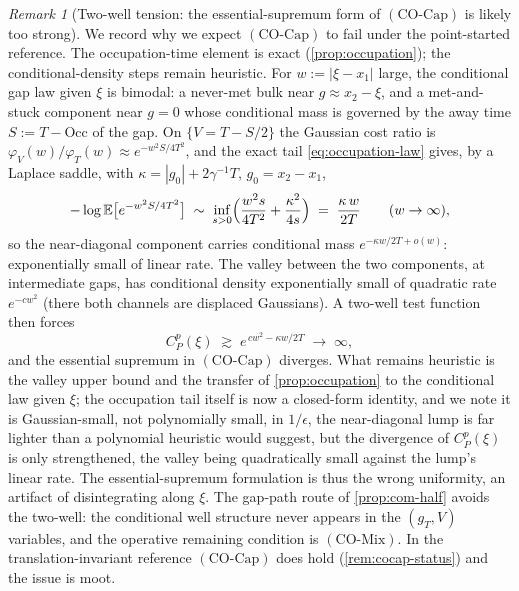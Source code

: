 \documentclass[reqno,final,11pt]{amsart}
\theoremstyle{plain}
\theoremstyle{definition}
\theoremstyle{remark}
\newtheorem{remark}[theorem]{Remark}
\newcommand{\E}{\mathbb E}
\newcommand{\COcap}{(\mathrm{CO\text{-}Cap})}
\newcommand{\COmix}{(\mathrm{CO\text{-}Mix})}
\begin{document}
\begin{remark}[Two-well tension: the essential-supremum form of $\COcap$ is likely too strong]\label{rem:two-well}
We record why we expect $\COcap$ to fail under the point-started
reference. The occupation-time element is exact
(\cref{prop:occupation}); the conditional-density steps remain heuristic. For
$w:=|\xi-x_1|$ large, the conditional gap law given $\xi$ is bimodal: a
never-met bulk near $g\approx x_2-\xi$, and a met-and-stuck
component near $g=0$ whose conditional mass is governed by the away time
$S:=T-\mathrm{Occ}$ of the gap. On $\{V=T-S/2\}$ the Gaussian cost ratio is
$\varphi_V(w)/\varphi_T(w)\approx e^{-w^2S/4T^2}$, and the exact tail
\eqref{eq:occupation-law} gives, by a Laplace saddle, with
$\kappa=|g_0|+2\gamma^{-1}T$, $g_0=x_2-x_1$,
\[
  -\log\E\bigl[e^{-w^2S/4T^2}\bigr]\;\sim\;
  \inf_{s>0}\Bigl(\frac{w^2s}{4T^2}+\frac{\kappa^2}{4s}\Bigr)
  \;=\;\frac{\kappa\,w}{2T}\qquad(w\to\infty),
\]
so the near-diagonal component carries conditional mass
$e^{-\kappa w/2T+o(w)}$: exponentially small of linear rate. The valley
between the two components, at intermediate gaps, has conditional density
exponentially small of quadratic rate $e^{-cw^2}$ (there both channels
are displaced Gaussians). A two-well test function then forces
\[
  C^p_P(\xi)\;\gtrsim\;e^{\,cw^2-\kappa w/2T}\;\longrightarrow\;\infty ,
\]
and the essential supremum in $\COcap$ diverges. What remains heuristic is the
valley upper bound and the transfer of \cref{prop:occupation} to the
conditional law given $\xi$; the occupation tail itself is now a closed-form
identity, and we note it is Gaussian-small, not polynomially small, in
$1/\epsilon$, the near-diagonal lump is far lighter than a polynomial
heuristic would suggest, but the divergence of $C^p_P(\xi)$ is only
strengthened, the valley being quadratically small against the lump's linear
rate. The essential-supremum formulation is thus the wrong uniformity, an
artifact of disintegrating along $\xi$. The gap-path route of
\cref{prop:com-half} avoids the two-well: the conditional well
structure never appears in the $(g_T,V)$ variables, and the operative remaining
condition is $\COmix$. In the translation-invariant reference $\COcap$ does
hold (\cref{rem:cocap-status}) and the issue is moot.
\end{remark}
\end{document}
